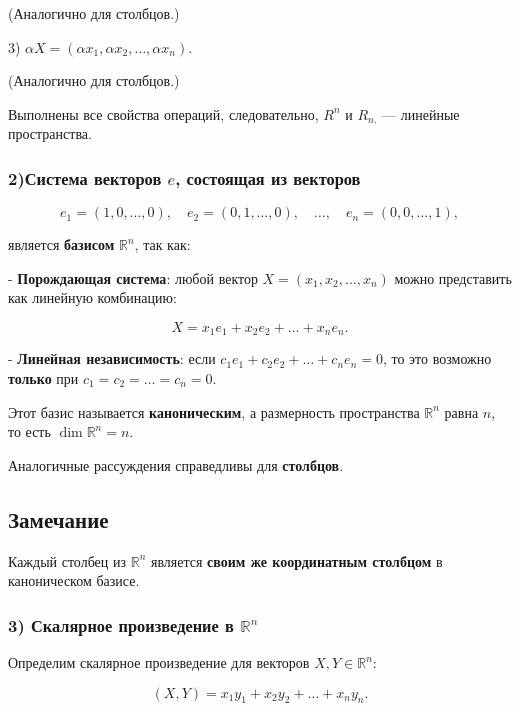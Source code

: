 {     (Аналогично для столбцов.)

  3) \( \alpha X = ( \alpha x_1, \alpha x_2, \dots, \alpha x_n ) \).

     (Аналогично для столбцов.)

Выполнены все свойства операций, следовательно, \( R^n \) и \( R_{n.} \) — линейные пространства.

\subsubsection*{2)Система векторов \( e\), состоящая из векторов  }  

\[
e_1 = (1, 0, \dots, 0), \quad e_2 = (0, 1, \dots, 0), \quad \dots, \quad e_n = (0, 0, \dots, 1),
\]

является \textbf{базисом} \( \mathbb{R}^n \), так как:

- \textbf{Порождающая система}: любой вектор \( X = (x_1, x_2, \dots, x_n) \) можно представить как линейную комбинацию:

  

\[
  X = x_1 e_1 + x_2 e_2 + \dots + x_n e_n.
  \]



- \textbf{Линейная независимость}: если \( c_1 e_1 + c_2 e_2 + \dots + c_n e_n = 0 \), то это возможно \textbf{только} при \( c_1 = c_2 = \dots = c_n = 0 \).

Этот базис называется \textbf{каноническим}, а размерность пространства \( \mathbb{R}^n \) равна \( n \), то есть \( \dim \mathbb{R}^n = n \).

Аналогичные рассуждения справедливы для \textbf{столбцов}.

\subsection*{Замечание}

Каждый столбец из \( \mathbb{R}^n \) является \textbf{своим же координатным столбцом} в каноническом базисе.

\subsubsection*{3) Скалярное произведение в \( \mathbb{R}^n \)}

Определим скалярное произведение для векторов \( X, Y \in \mathbb{R}^n \):



\[
(X, Y) = x_1 y_1 + x_2 y_2 + \dots + x_n y_n.
\]



}
